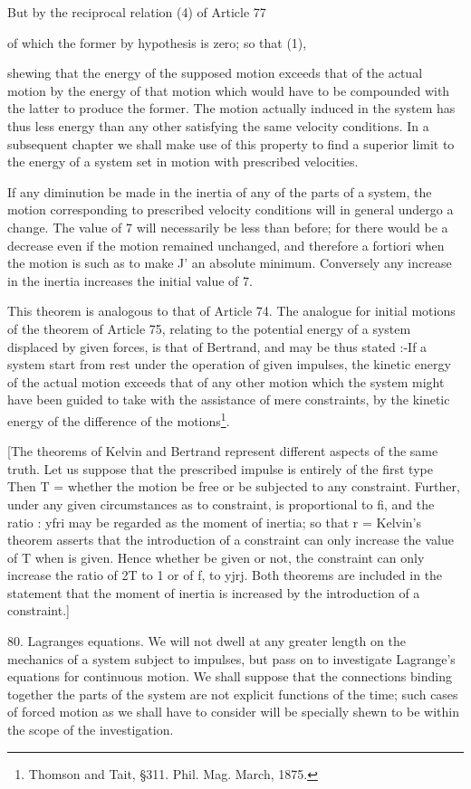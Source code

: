 But by the reciprocal relation (4) of Article 77

of which the former by hypothesis is zero; so that (1),

shewing that the energy of the supposed motion exceeds that of the actual
motion by the energy of that motion which would have to be compounded with the
latter to produce the former. The motion actually induced in the system has
thus less energy than any other satisfying the same velocity conditions. In a
subsequent chapter we shall make use of this property to find a superior limit
to the energy of a system set in motion with prescribed velocities.

If any diminution be made in the inertia of any of the parts of a system, the
motion corresponding to prescribed velocity conditions will in general undergo
a change. The value of 7 will necessarily be less than before; for there would
be a decrease even if the motion remained unchanged, and therefore a fortiori
when the motion is such as to make J' an absolute minimum. Conversely any
increase in the inertia increases the initial value of 7.

This theorem is analogous to that of Article 74. The analogue for initial
motions of the theorem of Article 75, relating to the potential energy of a
system displaced by given forces, is that of Bertrand, and may be thus stated
:-If a system start from rest under the operation of given impulses, the
kinetic energy of the actual motion exceeds that of any other motion which the
system might have been guided to take with the assistance of mere constraints,
by the kinetic energy of the difference of the motions\footnote{Thomson and
Tait, \S 311. Phil. Mag. March, 1875.}.

[The theorems of Kelvin and Bertrand represent different aspects of the same
truth. Let us suppose that the prescribed impulse is entirely of the first type
Then T = whether the motion be free or be subjected to any constraint. Further,
under any given circumstances as to constraint, is proportional to fi, and the
ratio : yfri may be regarded as the moment of inertia; so that r = Kelvin’s
theorem asserts that the introduction of a constraint can only increase the
value of T when is given. Hence whether be given or not, the constraint can
only increase the ratio of 2T to  1 or of f, to yjrj. Both theorems are
included in the statement that the moment of inertia is increased by the
introduction of a constraint.]


80.  Lagranges equations.
We will not dwell at any greater length on the mechanics of a system
subject to impulses, but pass on to investigate Lagrange's equations for
continuous motion. We shall suppose that the connections binding together the
parts of the system are not explicit functions of the time; such cases of
forced motion as we shall have to consider will be specially shewn to be within
the scope of the investigation.

